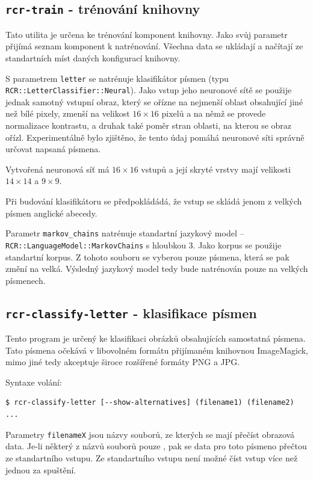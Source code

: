 \documentclass[a4paper]{article}
\begin{document}
\subsection{\texttt{rcr-train} - trénování knihovny}
Tato utilita je určena ke trénování komponent knihovny.
Jako svůj parametr přijímá seznam komponent k natrénování.
Všechna data se ukládají a načítají ze standartních míst daných konfigurací
knihovny.

S parametrem \texttt{letter} se natrénuje klasifikátor
písmen (typu \texttt{RCR::LetterClassifier::Neural}). Jako
vstup jeho neuronové sítě se použije jednak samotný vstupní obraz,
který se ořízne na nejmenší oblast obsahující jiné než bílé pixely,
zmenší na velikost $16\times 16$ pixelů a na němž se provede normalizace
kontrastu, a druhak také poměr stran oblasti, na kterou se obraz ořízl.
Experimentálně bylo zjištěno, že tento údaj pomáhá neuronové síti správně
určovat napsaná písmena.

Vytvořená neuronová síť má $16\times 16$ vstupů a její skryté vrstvy mají
velikosti $14\times 14$ a $9\times 9$.

Při budování klasifikátoru se předpokládádá, že vstup se skládá jenom
z velkých písmen anglické abecedy.

Parametr \texttt{markov\_chains} natrénuje standartní jazykový model --
\texttt{RCR::LanguageModel::MarkovChains} s hloubkou 3. Jako korpus se použije
standartní korpus. Z tohoto souboru se vyberou pouze písmena, která se pak změní
na velká. Výsledný jazykový model tedy bude natrénován pouze na velkých
písmenech.

\subsection{\texttt{rcr-classify-letter} - klasifikace písmen}
Tento program je určený ke klasifikaci obrázků obsahujících samostatná písmena.
Tato písmena očekává v libovolném formátu přijímaném knihovnou ImageMagick,
mimo jiné tedy akceptuje široce rozšířené formáty PNG a JPG.

Syntaxe volání:
\begin{lstlisting}
$ rcr-classify-letter [--show-alternatives] (filename1) (filename2) ...
\end{lstlisting}

Parametry \texttt{filenameX} jsou názvy souborů, ze kterých se mají přečíst
obrazová data. Je-li některý z názvů souborů pouze \uv{\texttt{-}}, pak se data
pro toto písmeno přečtou ze standartního vstupu. Ze standartního vstupu
není možné číst vstup více než jednou za spuštění.
\end{document}
